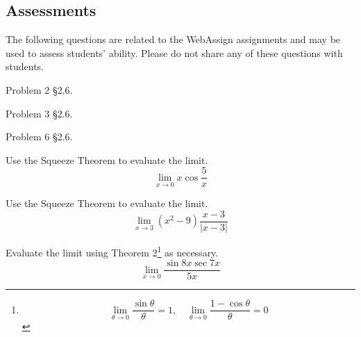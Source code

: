 \documentclass[12pt,addpoints, answers, fleqn]{exam}
\begin{document}
\begin{teacher}
\subsection{Assessments}
The following questions are related to the WebAssign assignments and may be used to assess students' ability. Please do not share any of these questions with students.
\begin{questions}
	
\question 	%

Problem 2 \S2.6.
\begin{solution}
\end{solution}

\question 	%

Problem 3 \S2.6.
\begin{solution}
\end{solution}

\question 	%

Problem 6 \S2.6.
\begin{solution}

\end{solution}

\question 	%

Use the Squeeze Theorem to evaluate the limit.
\[
\lim_{x \to 0} x \cos \frac{5}{x}
\]
\begin{solution}

\end{solution}

\question 	%

Use the Squeeze Theorem to evaluate the limit.
\[
\lim_{x \to 3} \left(x^2 - 9\right) \frac{x - 3}{\left|x - 3\right|}
\]
\begin{solution}

\end{solution}

\question 	%

Evaluate the limit using Theorem 2\footnote{\[ \lim_{\theta \to 0} \frac{\sin \theta}{\theta} =1, \quad \lim_{\theta \to 0} \frac{1 - \cos \theta}{\theta} =0 \]} as necessary.
\[
\lim_{x \to 0} \frac{\sin 8x \sec 7x}{5x}
\]
\begin{solution}

\end{solution}


\question 	%


\end{questions}
\end{teacher}
\end{document}
